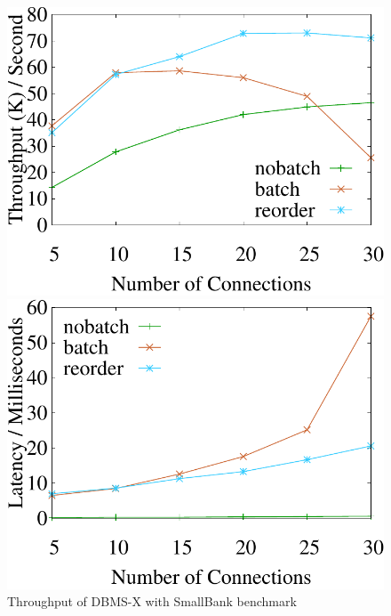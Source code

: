 \begin{figure}[t]
	\centering
	\begin{minipage}[b]{0.31\linewidth}
		\centering
		\includegraphics[width=\textwidth]{./exp_fig/hekaton/pdf/hekaton_tps}
		\caption{Throughput of DBMS-X with SmallBank benchmark}
		\label{fig:hekaton:tps}
	\end{minipage}
	\begin{minipage}[b]{0.31\linewidth}
	\centering
	\includegraphics[width=\textwidth]{./exp_fig/hekaton/pdf/hekaton_latency}

\end{minipage}
\end{figure}
